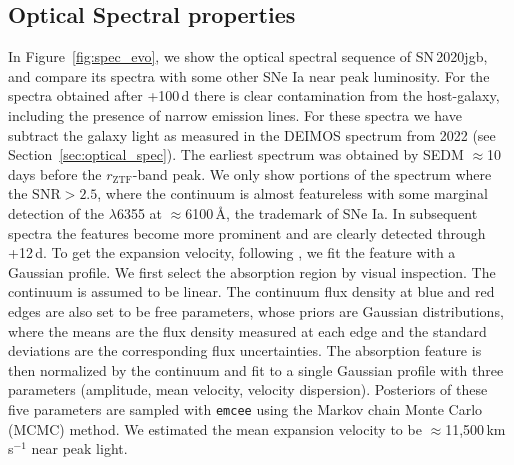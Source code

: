\documentclass[twocolumn]{aastex631}
\newcommand{\sn}{SN\,2020jgb}
\begin{document}
\subsection{Optical Spectral properties}
In Figure~\ref{fig:spec_evo}, we show the optical spectral sequence of \sn, and compare its spectra with some other SNe Ia near peak luminosity. For the spectra obtained after +100\,d there is clear contamination from the host-galaxy, including the presence of narrow emission lines. For these spectra we have subtract the galaxy light as measured in the DEIMOS spectrum from 2022 (see Section~\ref{sec:optical_spec}). The earliest spectrum was obtained by SEDM $\approx$10\,days before the $r_\mathrm{ZTF}$-band peak. We only show portions of the spectrum where the $\mathrm{SNR}>2.5$, where the continuum is almost featureless with some marginal detection of the  $\lambda$6355 at $\approx$6100\,\r{A}, the trademark of SNe Ia. In subsequent spectra the  features become more prominent and are clearly detected through +12\,d. To get the expansion velocity, following \citet{Maguire_2014}, we fit the  feature with a Gaussian profile. We first select the absorption region by visual inspection. The continuum is assumed to be linear. The continuum flux density at blue and red edges are also set to be free parameters, whose priors are Gaussian distributions, where the means are the flux density measured at each edge and the standard deviations are the corresponding flux uncertainties. The absorption feature is then normalized by the continuum and fit to a single Gaussian profile with three parameters (amplitude, mean velocity, velocity dispersion). Posteriors of these five parameters are sampled with \texttt{emcee} \citep{emcee_2013} using the Markov chain Monte Carlo (MCMC) method. We estimated the mean expansion velocity to be $\approx$11,500\,km\,s$^{-1}$ near peak light.
\end{document}
